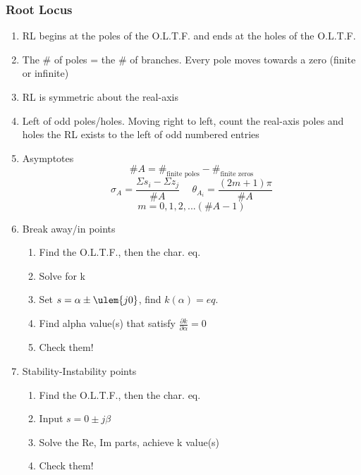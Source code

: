 \documentclass[twocolumn, 12pt]{article}
\begin{document}
\subsubsection*{Root Locus}
\begin{enumerate}
    \item RL begins at the poles of the O.L.T.F. and ends at the holes of the O.L.T.F.
    \item The \# of poles = the \# of branches. Every pole moves towards a zero (finite or infinite)
    \item RL is symmetric about the real-axis
    \item Left of odd poles/holes. Moving right to left, count the real-axis poles and holes the RL exists to the left of odd numbered entries
    \item Asymptotes
        \begin{equation*}
            \#A = \#_{\text{finite poles}} - \#_{\text{finite zeros}}
        \end{equation*}
        \begin{equation*}
          \sigma_A = \frac{\Sigma s_i-\Sigma z_j}{\#A} \hspace{15pt} \theta_{A_i}= \frac{(2m+1)\pi}{\#A}
        \end{equation*} 
        \begin{equation*}
           m = 0,1,2,... (\#A-1)
        \end{equation*}
    \item Break away/in points
        \begin{enumerate}
            \item Find the O.L.T.F., then the char. eq.
            \item Solve for k
            \item Set \(s=\alpha \pm \ulem{j0}\), find \(k(\alpha) =eq.\)
            \item Find alpha value(s) that satisfy \(\frac{\partial k}{\partial\alpha}
            = 0\)
            \item Check them!
        \end{enumerate}
    \item Stability-Instability points
        \begin{enumerate}
            \item Find the O.L.T.F., then the char. eq.
            \item Input \(s=0\pm j\beta\)
            \item Solve the Re, Im parts, achieve k value(s)
            \item Check them!
        \end{enumerate}
\end{enumerate}
\end{document}
